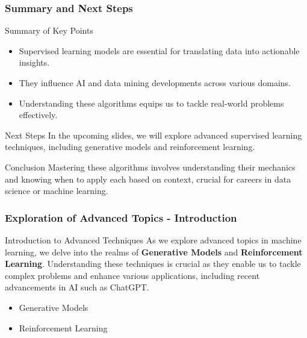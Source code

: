 \documentclass[aspectratio=169]{beamer}
\begin{document}
\begin{frame}[fragile]
    \frametitle{Summary and Next Steps}
    \begin{block}{Summary of Key Points}
        \begin{itemize}
            \item Supervised learning models are essential for translating data into actionable insights.
            \item They influence AI and data mining developments across various domains.
            \item Understanding these algorithms equips us to tackle real-world problems effectively.
        \end{itemize}
    \end{block}
    
    \begin{block}{Next Steps}
        In the upcoming slides, we will explore advanced supervised learning techniques, including generative models and reinforcement learning.
    \end{block}
    
    \begin{block}{Conclusion}
        Mastering these algorithms involves understanding their mechanics and knowing when to apply each based on context, crucial for careers in data science or machine learning.
    \end{block}
\end{frame}

\begin{frame}[fragile]
    \frametitle{Exploration of Advanced Topics - Introduction}
    \begin{block}{Introduction to Advanced Techniques}
        As we explore advanced topics in machine learning, we delve into the realms of \textbf{Generative Models} and \textbf{Reinforcement Learning}. 
        Understanding these techniques is crucial as they enable us to tackle complex problems and enhance various applications, including recent advancements in AI such as ChatGPT.
    \end{block}
    \begin{itemize}
        \item Generative Models
        \item Reinforcement Learning
    \end{itemize}
\end{frame}
\end{document}
